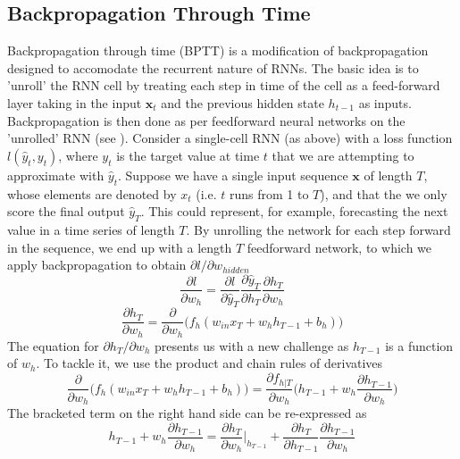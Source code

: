 \documentclass[]{article}
\begin{document}
\subsection{Backpropagation Through Time}
Backpropagation through time (BPTT) is a modification of backpropagation designed to accomodate the recurrent nature of RNNs. The basic idea is to 'unroll' the RNN cell by treating each step in time of the cell as a feed-forward layer taking in the input $\textbf{x}_{t}$ and the previous hidden state $h_{t-1}$ as inputs. Backpropagation is then done as per feedforward neural networks on the 'unrolled' RNN (see ).
\newline
\newline
Consider a single-cell RNN (as above) with a loss function $l(\hat{y}_{t}, y_{t})$, where $y_{t}$ is the target value at time $t$ that we are attempting to approximate with $\hat{y}_{t}$. Suppose we have a single input sequence $\textbf{x}$ of length $T$, whose elements are denoted by $x_{t}$ (i.e. $t$ runs from 1 to $T$), and that the we only score the final output $\hat{y}_{T}$. This could represent, for example, forecasting the next value in a time series of length $T$. By unrolling the network for each step forward in the sequence, we end up with a length $T$ feedforward network, to which we apply backpropagation to obtain $\partial l/\partial w_{hidden}$
\begin{equation}
\frac{\partial l}{\partial w_{h}} = \frac{\partial l}{\partial \hat{y}_{T}} \frac{\partial \hat{y}_{T}}{\partial h_{T}} \frac{\partial h_{T}}{\partial w_{h}}\label{eq:3}
\end{equation}
\begin{equation}
\frac{\partial h_{T}}{\partial w_{h}} = \frac{\partial}{\partial w_{h}} \bigg(f_{h}(w_{in} x_{T} + w_{h} h_{T-1} + b_{h}) \bigg)
\end{equation}
The equation for $\partial h_{T}/ \partial w_{h}$ presents us with a new challenge as $h_{T-1}$ is a function of $w_{h}$. To tackle it, we use the product and chain rules of derivatives
\begin{equation}
 \frac{\partial}{\partial w_{h}} \bigg(f_{h}(w_{in} x_{T} + w_{h} h_{T-1} + b_{h}) \bigg) = \frac{\partial f_{h|T}}{\partial w_{h}} \bigg( h_{T-1} + w_{h}  \frac{\partial h_{T-1}}{\partial w_{h}} \bigg)
\end{equation}
The bracketed term on the right hand side can be re-expressed as
\begin{equation}
h_{T-1} + w_{h}  \frac{\partial h_{T-1}}{\partial w_{h}} = \frac{\partial h_{T}}{\partial w_{h}} \bigg|_{h_{T-1}} + \frac{\partial h_{T}}{\partial h_{T-1}} \frac{\partial h_{T-1}}{\partial w_{h}}
\end{equation}
\end{document}
